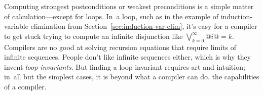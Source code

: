 \documentclass[blockstyle,preprint,natbib,nocopyrightspace]{sigplanconf}
\newcommand\secref[1]{Section~\ref{sec:#1}}
\begin{document}
Computing strongest postconditions or weakest
preconditions is a simple matter of calculation---except for loops.
In~a loop, such as in the example of induction-variable elimination from
\secref{induction-var-elim}, 
it's easy for a compiler to get stuck trying to compute an
infinite disjunction like $\bigvee_{k=0}^{\infty} @i@=k$.
Compilers are no good at solving recursion
equations that require limits of infinite sequences.
%
People don't like infinite sequences either, which is why they invent
\emph{loop invariants}. 
But finding a loop invariant requires art and intuition;
in~all but the simplest cases, it is beyond
\ifpagetuning
what a compiler can do.
\else
the capabilities of a compiler.
\fi


\end{document}
